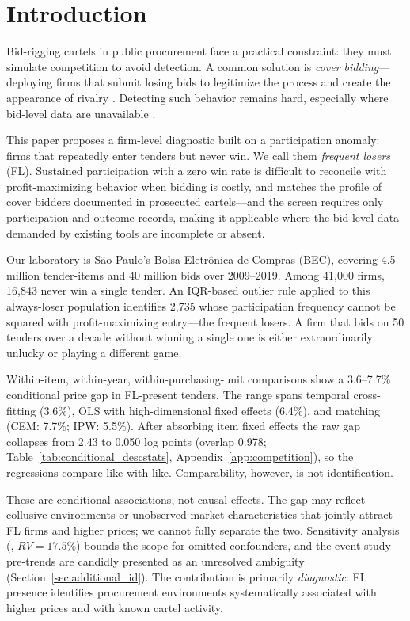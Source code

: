 \section{Introduction}
\label{sec:intro}

Bid-rigging cartels in public procurement face a practical constraint:
they must simulate competition to avoid detection. A common solution is
\emph{cover bidding}---deploying firms that submit losing bids to
legitimize the process and create the appearance of rivalry
\citep{marshall2012economics, asker2010leniency}. Detecting such
behavior remains hard, especially where bid-level data are unavailable
\citep{harrington2008detecting, imhof2019detecting}.

This paper proposes a firm-level diagnostic built on a participation
anomaly: firms that repeatedly enter tenders but never win. We call
them \emph{frequent losers} (FL). Sustained participation with a zero
win rate is difficult to reconcile with profit-maximizing behavior
when bidding is costly, and matches the profile of cover bidders
documented in prosecuted cartels---and the screen requires only
participation and outcome records, making it applicable where the
bid-level data demanded by existing tools are incomplete or absent.

Our laboratory is S\~ao Paulo's Bolsa Eletr\^onica de Compras (BEC),
covering 4.5 million tender-items and 40 million bids over
2009--2019. Among 41,000 firms, 16,843 never win a single tender.
An IQR-based outlier rule applied to this always-loser population
identifies 2,735 whose participation frequency cannot be squared with
profit-maximizing entry---the frequent losers. A firm that bids on
50 tenders over a decade without winning a single one is either
extraordinarily unlucky or playing a different game.

Within-item, within-year, within-purchasing-unit comparisons show a
3.6--7.7\% conditional price gap in FL-present tenders. The range
spans temporal cross-fitting (3.6\%), OLS with high-dimensional fixed
effects (6.4\%), and matching (CEM: 7.7\%; IPW: 5.5\%). After
absorbing item fixed effects the raw gap collapses from 2.43 to 0.050
log points (overlap 0.978; Table~\ref{tab:conditional_descstats},
Appendix~\ref{app:competition}), so the regressions compare like with
like. Comparability, however, is not identification.

These are conditional associations, not causal effects. The gap may
reflect collusive environments or unobserved market characteristics
that jointly attract FL firms and higher prices; we cannot fully
separate the two. Sensitivity analysis
(\citealt{cinelli2020making}, $RV = 17.5\%$) bounds the scope for
omitted confounders, and the event-study pre-trends are candidly
presented as an unresolved ambiguity
(Section~\ref{sec:additional_id}). The contribution is primarily
\emph{diagnostic}: FL presence identifies procurement environments
systematically associated with higher prices and with known cartel
activity.

